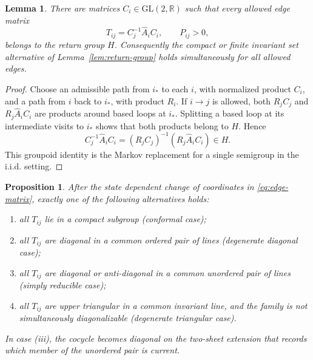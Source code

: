 \documentclass[11pt,a4paper]{amsart}
\newtheorem{proposition}[theorem]{Proposition}
\newtheorem{lemma}[theorem]{Lemma}
\theoremstyle{definition}
\theoremstyle{remark}
\numberwithin{equation}{section}
\newcommand{\RR}{\mathbb R}
\newcommand{\1}{\boldsymbol 1}
\begin{document}
\begin{lemma}%
\label{lem:transport}
There are matrices $C_i\in\mathrm{GL}(2,\RR)$ such that every allowed edge matrix
\begin{equation}\label{eq:edge-matrix}
 T_{ij}=C_j^{-1}\widehat A_iC_i,
 \qquad P_{ij}>0,
\end{equation}
belongs to the return group $H$.  Consequently the compact or
finite invariant set alternative of Lemma~\ref{lem:return-group} holds
simultaneously for all allowed edges.
\end{lemma}

\begin{proof}
Choose an admissible path from $i_*$ to each $i$, with normalized
product $C_i$, and a path from $i$ back to $i_*$, with product
$R_i$.  If $i\to j$ is allowed, both $R_jC_j$ and
$R_j\widehat A_iC_i$ are products around based loops at $i_*$.
Splitting a based loop at its intermediate visits to $i_*$ shows that
both products belong to $H$.  Hence
$$
 C_j^{-1}\widehat A_iC_i
 =(R_jC_j)^{-1}(R_j\widehat A_iC_i)\in H.
$$
This groupoid identity is the Markov replacement for a single semigroup
in the i.i.d. \cite{TV} setting.
\end{proof}


\begin{proposition}%
\label{prop:normal-forms}
After the state dependent change of coordinates in
\eqref{eq:edge-matrix}, exactly one of the following alternatives holds:
\begin{enumerate}[label=\textup{(\roman*)}]
\item all $T_{ij}$ lie in a compact subgroup (conformal case);
\item all $T_{ij}$ are diagonal in a common ordered pair of lines (degenerate diagonal case);
\item all $T_{ij}$ are diagonal or anti-diagonal in a common unordered pair of lines (simply reducible case);
\item all $T_{ij}$ are upper triangular in a common invariant line,
      and the family is not simultaneously diagonalizable (degenerate triangular case).
\end{enumerate}
In case \textup{(iii)}, the cocycle becomes diagonal on the two-sheet
extension that records which member of the unordered pair is current.
\end{proposition}
\end{document}
